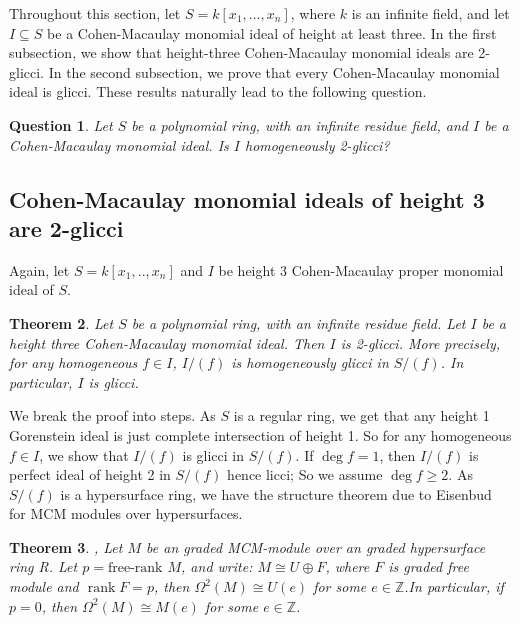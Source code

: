 \documentclass[11pt,letterpaper]{amsart}
\DeclareMathOperator{\rank}{rank}
\theoremstyle{plain}
\newtheorem{thm}{Theorem}[section]
\newtheorem{question}[thm]{Question}
\theoremstyle{definition}
\theoremstyle{remark}
\begin{document}
Throughout this section, let $S=k[x_1,\ldots,x_n]$,
where $k$ is an infinite field, and let $I\subseteq S$
be a Cohen-Macaulay monomial ideal of height at least
three. In the first subsection, we show that height-three Cohen-Macaulay monomial ideals are 2-glicci. In the second subsection, we prove that every Cohen-Macaulay monomial ideal is glicci.
These results naturally lead to the following question.
 

\begin{question}\label{Questionmonomial2glicci}
    Let $S$ be a polynomial ring, with an infinite residue field, and $I$ be a Cohen-Macaulay monomial ideal. Is $I$ homogeneously 2-glicci?
\end{question}

\subsection{Cohen-Macaulay monomial ideals of height 3 are 2-glicci}

Again, let $S=k[x_1,..,x_n]$ and $I$ be height 3 Cohen-Macaulay proper monomial ideal of $S$. 
\begin{thm}\label{height3monomialis2glicci}
    Let $S$ be a polynomial ring, with an infinite residue field. Let $I$ be a height three Cohen-Macaulay monomial ideal. Then $I$ is 2-glicci. More precisely, for any homogeneous $f\in I$, $I/(f)$ is homogeneously glicci in $S/(f)$. In particular, $I$ is glicci.
\end{thm}
We break the proof into steps. As $S$ is a regular ring, we get that any height 1 Gorenstein ideal is just complete intersection of height 1. So for any homogeneous $f\in I$, we show that $I/(f)$ is glicci in $S/(f)$. If $\deg f=1$, then $I/(f)$ is perfect ideal of height 2 in $S/(f)$ hence licci; So we assume $\deg f\ge 2$. As $S/(f)$ is a hypersurface ring, we have the structure theorem due to Eisenbud for MCM modules over hypersurfaces. 

\begin{thm}\label{eisenbud}\cite{eisenbud1980homological},\cite[Lemma~1.7]{herzog1987maximal}
Let $M$ be an graded MCM-module over
an graded hypersurface ring R. Let $p=\text{free-rank}$ $M$, and write: $M\cong U\oplus F$, where $F$ is graded free module and $\rank F=p$, 
then $\Omega^2(M)\cong U(e)$ for some $e\in\mathbb Z$.In particular, if $p=0$, then $\Omega^2(M)\cong M(e)$ for some $e\in\mathbb Z$.%
\end{thm}
\end{document}
